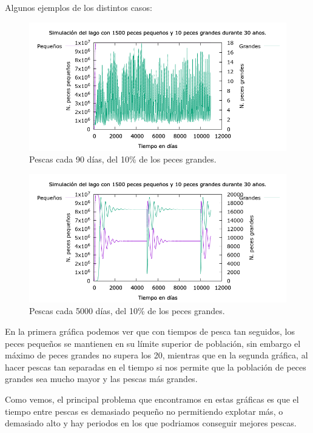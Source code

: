 \documentclass[12pt, spanish]{article}
\begin{document}
Algunos ejemplos de los distintos casos:



\begin{figure}[H]
	\centering
	\includegraphics[scale = 0.6]{lago_10950_1500_10_0.90_90.png}
	\caption{Pescas cada 90 días, del 10\% de los peces grandes.}
	\label{fig:ej4}
\end{figure}

\begin{figure}[H]
	\centering
	\includegraphics[scale = 0.6]{lago_10950_1500_10_0.90_5000.png}
	\caption{Pescas cada 5000 días, del 10\% de los peces grandes.}
	\label{fig:ej4}
\end{figure}

En la primera gráfica podemos ver que con tiempos de pesca tan seguidos, los peces pequeños se mantienen en su límite superior de población, sin embargo el máximo de peces grandes no supera los 20, mientras que en la segunda gráfica, al hacer pescas tan separadas en el tiempo si nos permite que la población de peces grandes sea mucho mayor y las pescas más grandes.

Como vemos, el principal problema que encontramos en estas gráficas es que el tiempo entre pescas es demasiado pequeño no permitiendo explotar más, o demasiado alto y hay periodos en los que podriamos conseguir mejores pescas.
\end{document}

